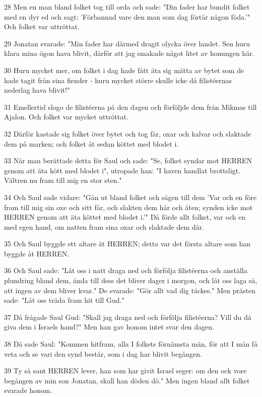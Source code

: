 \par 28 Men en man bland folket tog till orda och sade: "Din fader har bundit folket med en dyr ed och sagt: 'Förbannad vare den man som dag förtär någon föda.'" Och folket var uttröttat.
\par 29 Jonatan svarade: "Min fader har därmed dragit olycka över landet. Sen huru klara mina ögon hava blivit, därför att jag smakade något litet av honungen här.
\par 30 Huru mycket mer, om folket i dag hade fått äta sig mätta av bytet som de hade tagit från sina fiender - huru mycket större skulle icke då filistéernas nederlag hava blivit!"
\par 31 Emellertid slogo de filistéerna på den dagen och förföljde dem från Mikmas till Ajalon. Och folket var mycket uttröttat.
\par 32 Därför kastade sig folket över bytet och tog får, oxar och kalvar och slaktade dem på marken; och folket åt sedan köttet med blodet i.
\par 33 När man berättade detta för Saul och sade: "Se, folket syndar mot HERREN genom att äta kött med blodet i", utropade han: "I haven handlat brottsligt. Vältren nu fram till mig en stor sten."
\par 34 Och Saul sade vidare: "Gån ut bland folket och sägen till dem 'Var och en före fram till mig sin oxe och sitt får, och slakten dem här och äten; synden icke mot HERREN genom att äta köttet med blodet i.'" Då förde allt folket, var och en med egen hand, om natten fram sina oxar och slaktade dem där.
\par 35 Och Saul byggde ett altare åt HERREN; detta var det första altare som han byggde åt HERREN.
\par 36 Och Saul sade: "Låt oss i natt draga ned och förfölja filistéerna och anställa plundring bland dem, ända till dess det bliver dager i morgon, och låt oss laga så, att ingen av dem bliver kvar." De svarade: "Gör allt vad dig täckes." Men prästen sade: "Låt oss träda fram hit till Gud."
\par 37 Då frågade Saul Gud: "Skall jag draga ned och förfölja filistéerna? Vill du då giva dem i Israels hand?" Men han gav honom intet svar den dagen.
\par 38 Då sade Saul: "Kommen hitfram, alla I folkets förnämsta män, för att I mån få veta och se vari den synd består, som i dag har blivit begången.
\par 39 Ty så sant HERREN lever, han som har givit Israel seger: om den ock vore begången av min son Jonatan, skall han döden dö." Men ingen bland allt folket svarade honom.

